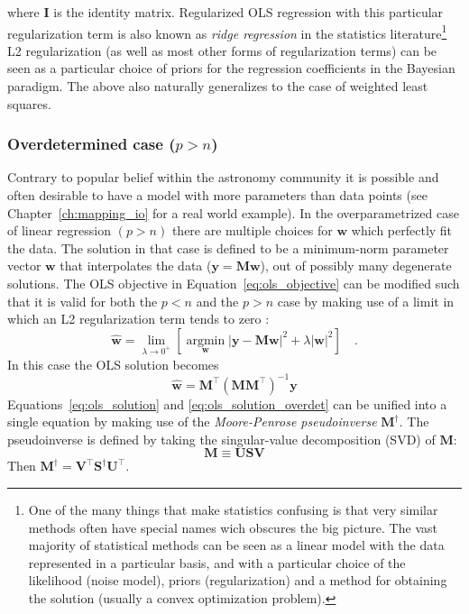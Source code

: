 \documentclass[12pt,dvipsnames]{report}
\renewcommand{\vec}[1]{\boldsymbol{\mathbf{#1}}}
\begin{document}
where $\vec{I}$ is the identity matrix. Regularized OLS regression with this particular
regularization term is also known as \emph{ridge regression} in the statistics
literature\footnote{One of the many things that make statistics confusing is that very
    similar methods often have special names wich obscures the big picture. The vast majority
    of statistical methods can be seen as a linear model with the data represented in a particular
    basis, and with a particular choice of the likelihood (noise model), priors (regularization)
    and  a method for obtaining the solution (usually a convex optimization problem).}
L2 regularization (as well as most other forms of regularization terms) can be seen
as a particular choice of priors for the regression coefficients in the Bayesian paradigm.
The above also naturally generalizes to the case of weighted least squares.

\subsubsection{Overdetermined case ($p > n$)}
Contrary to popular belief within the astronomy community it is possible and
often desirable to have a model with more parameters than data points (see
Chapter~\ref{ch:mapping_io} for a real world example). In the overparametrized
case of linear regression $(p > n)$ there are multiple choices for $\vec{w}$
which perfectly fit the data. The solution in that case is defined to be a
minimum-norm parameter vector $\vec{w}$ that interpolates the data
($\vec{y}=\vec{M} \vec{w}$), out of possibly many degenerate solutions. The OLS
objective in Equation~\ref{eq:ols_objective} can be modified such that it is
valid for both the $p<n$ and the $p>n$ case by making use of a limit in which
an L2 regularization term tends to zero \citep{arXiv:2101.07256}:
\begin{equation}
    \hat{\vec{w}}=\lim _{\lambda \rightarrow 0^{+}}\left[
    \underset{\boldsymbol{w}}{\operatorname{argmin}}\left|\vec{y}-\vec{M} \vec{w}\right|^{2} + \lambda \left|\vec{w}\right|^2\right]\quad .
\end{equation}
In this case the OLS solution becomes
\begin{equation}
    \hat{\vec{w}}=\vec{M}^{\intercal} (\vec{M} \vec{M}^{\intercal})^{-1} \vec{y}
    \label{eq:ols_solution_overdet}
\end{equation}
Equations~\ref{eq:ols_solution} and \ref{eq:ols_solution_overdet} can be unified into a
single equation by making use of the \emph{Moore-Penrose pseudoinverse} $\vec{M}^\dagger$.
The pseudoinverse is defined by taking the singular-value decomposition (SVD)
of $\vec{M}$:
\begin{equation}
    \vec{M}\equiv\vec{U} \vec{S} \vec{V}
\end{equation}
Then $\vec{M}^\dagger =  \vec{V}^{\intercal} \vec{S}^{\dagger} \vec{U}^{\intercal}$.
\end{document}
